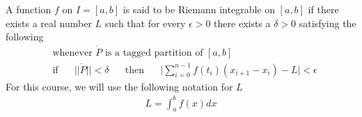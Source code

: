 \begin{definition}
A function $f$ on $I=[a, b]$ is said to be Riemann integrable on $[a, b]$ if there exists a real number $L$ such that for every $\epsilon > 0$ there exists a $\delta > 0$ satisfying the following
\begin{align*}
    &\text{whenever} \hspace{4pt} \dot P \hspace{4pt} \text{is a tagged partition of $[a, b]$}\\[2ex]
    &\text{if} \hspace{20pt} \lvert \lvert \dot P \rvert \rvert < \delta \hspace{20pt} \text{then} \hspace{20pt} \Big\lvert \sum_{i=0}^{n-1} f(t_{i})(x_{i+1} - x_{i}) - L \Big\rvert < \epsilon  
\end{align*}
For this course, we will use the following notation for $L$
\begin{align*}
    L = \int_{a}^{b} f(x) dx
\end{align*}
\end{definition}

